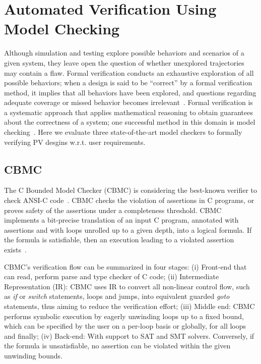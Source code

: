 \documentclass[runningheads]{llncs}
\begin{document}
\section{Automated Verification Using Model Checking}
\label{sec:AutomatedVerification}

Although simulation and testing explore possible behaviors and scenarios of a given system, they leave open the question of whether unexplored trajectories may contain a flaw. Formal verification conducts an exhaustive exploration of all possible behaviors; when a design is said to be ``correct'' by a formal verification method, it implies that all behaviors have been explored, and questions regarding adequate coverage or missed behavior becomes irrelevant~\cite{Clarke2012}. Formal verification is a systematic approach that applies mathematical reasoning to obtain guarantees about the correctness of a system; one successful method in this domain is model checking~\cite{Clarke2012}. Here we evaluate three state-of-the-art model checkers to formally verifying PV desgins w.r.t. user requirements.

\subsection{CBMC}

The C Bounded Model Checker (CBMC) is considering the best-known verifier to check ANSI-C code~\cite{Kroening}. 
CBMC checks the violation of assertions in C programs, or proves safety of the assertions under a completeness threshold.
CBMC implements a bit-precise translation of an input C program, annotated with assertions and with loops unrolled 
up to a given depth, into a logical formula. If the formula is satisfiable, then an execution leading to a violated assertion exists~\cite{Kroening}.

CBMC's verification flow can be summarized in four stages: 
(i) Front-end that can read, perform parse and type checker of C code; 
(ii) Intermediate Representation (IR): CBMC uses IR to convert all non-linear control flow, 
such as \textit{if} or \textit{switch} statements, loops and jumps, into equivalent guarded 
\textit{goto} statements, thus aiming to reduce the verification effort; 
(iii) Middle end: CBMC performs symbolic execution by eagerly unwinding loops up to a fixed bound, 
which can be specified by the user on a per-loop basis or globally, for all loops and finally; 
(iv) Back-end: With support to SAT and SMT solvers. Conversely, if the formula is unsatisfiable, no assertion can be violated within the given unwinding bounds.
\end{document}
